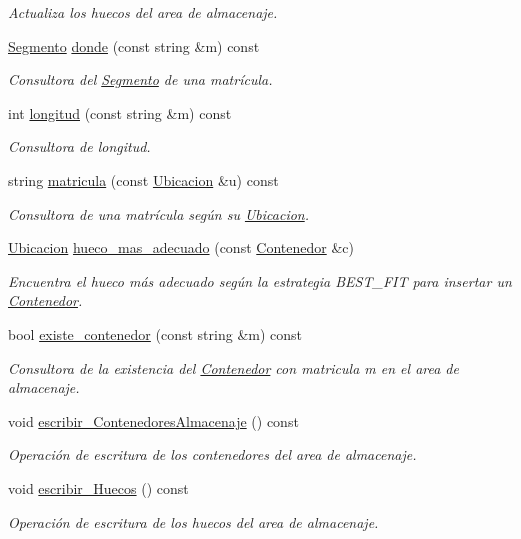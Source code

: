 \begin{DoxyCompactItemize}
\begin{DoxyCompactList}\small\item\em Actualiza los huecos del area de almacenaje. \end{DoxyCompactList}\item 
\hyperlink{class_segmento}{Segmento} \hyperlink{class_almacenaje_afe08e4bca255d4baf3750019622e6cb2}{donde} (const string \&m) const
\begin{DoxyCompactList}\small\item\em Consultora del \hyperlink{class_segmento}{Segmento} de una matrícula. \end{DoxyCompactList}\item 
int \hyperlink{class_almacenaje_a745cf4e181058d391aed220843d6cede}{longitud} (const string \&m) const
\begin{DoxyCompactList}\small\item\em Consultora de longitud. \end{DoxyCompactList}\item 
string \hyperlink{class_almacenaje_a57347af1a15e11fa1e2a71621f867c0f}{matricula} (const \hyperlink{class_ubicacion}{Ubicacion} \&u) const
\begin{DoxyCompactList}\small\item\em Consultora de una matrícula según su \hyperlink{class_ubicacion}{Ubicacion}. \end{DoxyCompactList}\item 
\hyperlink{class_ubicacion}{Ubicacion} \hyperlink{class_almacenaje_a8a62209a8e83a59eb900913c3dc5f377}{hueco\+\_\+mas\+\_\+adecuado} (const \hyperlink{class_contenedor}{Contenedor} \&c)
\begin{DoxyCompactList}\small\item\em Encuentra el hueco más adecuado según la estrategia B\+E\+S\+T\+\_\+\+F\+IT para insertar un \hyperlink{class_contenedor}{Contenedor}. \end{DoxyCompactList}\item 
bool \hyperlink{class_almacenaje_aa846d1cf215bd139527d2607d4cee833}{existe\+\_\+contenedor} (const string \&m) const
\begin{DoxyCompactList}\small\item\em Consultora de la existencia del \hyperlink{class_contenedor}{Contenedor} con matricula {\itshape m} en el area de almacenaje. \end{DoxyCompactList}\item 
void \hyperlink{class_almacenaje_a5de7fa3a41e402feecac670c226a058f}{escribir\+\_\+\+Contenedores\+Almacenaje} () const
\begin{DoxyCompactList}\small\item\em Operación de escritura de los contenedores del area de almacenaje. \end{DoxyCompactList}\item 
void \hyperlink{class_almacenaje_a29e009f94265ea34b860f0918d3e1992}{escribir\+\_\+\+Huecos} () const
\begin{DoxyCompactList}\small\item\em Operación de escritura de los huecos del area de almacenaje. \end{DoxyCompactList}\end{DoxyCompactItemize}


